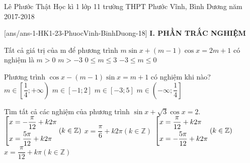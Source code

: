\begin{name}
{Lê Phước Thật}
{Học kì 1 lớp 11 trường THPT Phước Vĩnh, Bình Dương năm 2017-2018}
\end{name}
\setcounter{ex}{0}
[ans/ans-1-HK1-23-PhuocVinh-BinhDuong-18]
\noindent\textbf{I. PHẦN TRẮC NGHIỆM}
\begin{ex}%
Tất cả giá trị của m để phương trình $m\sin x+\left( m-1 \right)\cos x=2m+1$ có nghiệm là
\choice
{$m>0$}
{$m>-3$}
{$0\le m\le 3$}
{\True $-3\le m\le 0$}
\end{ex}

\begin{ex}%
Phương trình $\cos x-\left( m-1 \right)\sin x=m+1$ có nghiệm khi nào?
\choice
{$m\in \left[ \dfrac{1}{4};+\infty  \right)$}
{$m\in \left[ -1;2 \right]$}
{$m\in \left[ -3;5 \right]$}
{\True $m\in \left( -\infty ;\dfrac{1}{4} \right]$}
\loigiai{
Phương trình có nghiệm khi và chỉ khi $1+(m-1)^2 \ge (m+1)^2 \Leftrightarrow 4m-1 \le 0 \Leftrightarrow m \le \dfrac{1}{4}$.\\
Vậy $m \in \left(-\infty;\dfrac{1}{4}\right]$.
}
\end{ex}

\begin{ex}%
Tìm tất cả các nghiệm của phương trình $\sin x+\sqrt{3}\cos x=2$.
\choice
{$\left[\begin{aligned} & x=-\dfrac{\pi }{12}+k2\pi  \\&x=\dfrac{5\pi}{12}+k2\pi\end{aligned}\right. (k \in \mathbb{Z})$}
{\True $x=\dfrac{\pi }{6}+k2\pi (k\in \mathbb{Z})$}
{$\left[\begin{aligned} & x=\dfrac{\pi }{12}+k2\pi  \\&x=-\dfrac{5\pi }{12}+k2\pi \end{aligned}\right. (k \in \mathbb{Z})$}
{$x=\dfrac{\pi }{12}+k\pi (k\in \mathbb{Z})$}
\end{ex}

